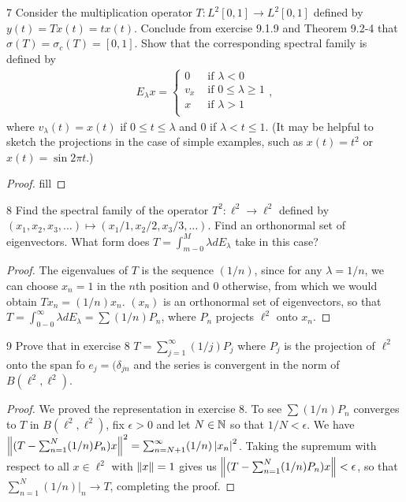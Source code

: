 \begin{exercise}{7}
Consider the multiplication operator $T: L^2[0, 1] \to L^2[0,1]$ defined by $y(t) = T x(t) = t x(t)$.
Conclude from exercise 9.1.9 and Theorem 9.2-4 that $\sigma(T) = \sigma_c(T) = [0, 1]$. 
Show that the corresponding spectral family is defined by
\begin{align*}
    E_\lambda x = 
    \begin{cases}
        0   &\text{ if } \lambda < 0\\
        v_x &\text{ if } 0 \leq \lambda \geq 1\\
        x   &\text{ if } \lambda > 1\\
    \end{cases},
\end{align*}
where $v_\lambda(t) = x(t)$ if $0 \leq t \leq \lambda$ and 0 if $\lambda < t \leq 1$.
(It may be helpful to sketch the projections in the case of simple examples, such as $x(t) = t^2$ or $x(t) = \sin 2 \pi t$.)
\end{exercise}
\begin{proof}
fill
\end{proof} 

\begin{exercise}{8}
Find the spectral family of the operator $T^2: \ell^2 \to \ell^2$ defined by $(x_1, x_2, x_3, \dots) \mapsto (x_1/1, x_2/2, x_3/3, \dots)$.
Find an orthonormal set of eigenvectors.
What form does $T = \int_{m-0}^M \lambda d E_\lambda$ take in this case?
\end{exercise}
\begin{proof}
The eigenvalues of $T$ is the sequence $(1/n)$, since for any $\lambda = 1/n$, we can choose $x_n = 1$ in the $n$th position and 0 otherwise, from which we would obtain $Tx_n = (1/n)x_n$.
$(x_n)$ is an orthonormal set of eigenvectors, so that $T = \int_{0-0}^\infty \lambda d E_\lambda = \sum (1/n) P_n$, where $P_n$ projects $\ell^2$ onto $x_n$.
\end{proof} 

\begin{exercise}{9}
Prove that in exercise 8 $T = \sum_{j=1}^\infty (1/j) P_j$ where $P_j$ is the projection of $\ell^2$ onto the span fo $e_j = (\delta_{jn}$ and the series is convergent in the norm of $B(\ell^2, \ell^2)$.
\end{exercise}
\begin{proof}
We proved the representation in exercise 8.
To see $\sum (1/n) P_n$ converges to $T$ in $B(\ell^2, \ell^2)$, fix $\epsilon > 0$ and let $N \in \mathbb{N}$ so that $1/N < \epsilon$.
We have $\left\lVert (T - \sum_{n=1}^N (1/n) P_n) x\right\rVert^2 = \sum_{n=N+1}^\infty (1/n) \left\lvert x_n\right\rvert^2$.
Taking the supremum with respect to all $x \in \ell^2$ with $\left\lVert x\right\rVert = 1$ gives us $\left\lVert (T - \sum_{n=1}^N (1/n) P_n) x\right\rVert < \epsilon$, so that $\sum_{n=1}^N (1/n) |_n \to T$, completing the proof.
\end{proof} 

